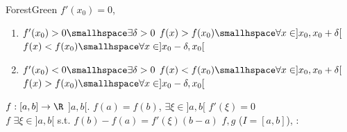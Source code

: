 \begin{simplebox}[]{ForestGreen}
    \shorttheorem {} $f'(x_0) = 0$, 
    \vspace{-0.8pc}
    \begin{multicols}{2}
        \begin{enumerate}
            \item \trIf $f'(x_0) > 0 \smallhspace \exists \delta > 0$ \trst $f(x) > f(x_0) \smallhspace \forall x \in ]x_0, x_0 + \delta[$ \trand $f(x) < f(x_0) \smallhspace \forall x \in ]x_0 - \delta, x_0[$
            \item \trIf $f'(x_0) < 0 \smallhspace \exists \delta > 0$ \trst $f(x) < f(x_0) \smallhspace \forall x \in ]x_0, x_0 + \delta[$ \trand $f(x) > f(x_0) \smallhspace \forall x \in ]x_0 - \delta, x_0[$
        \end{enumerate}
    \end{multicols}
\end{simplebox}
\shorttheorem \trLet $f: [a, b] \rightarrow \R$  $]a, b[$. \trIf $f(a) = f(b)$, $\exists \xi \in ]a, b[$ \trwith $f'(\xi) = 0$\\
%
\shorttheorem \trLet $f$  $\exists \xi \in ]a, b[$ s.t. $f(b) - f(a) = f'(\xi)(b - a)$
%
\shortcorollary \trLet $f, g$  ($I = [a, b]$), :
